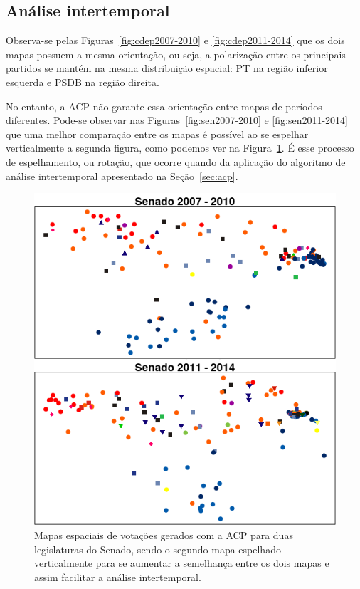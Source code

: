\documentclass[a4paper, 12pt]{article}
\begin{document}
\subsection*{Análise intertemporal}

Observa-se pelas Figuras~\ref{fig:cdep2007-2010} e \ref{fig:cdep2011-2014} que os dois mapas possuem a mesma orientação, ou seja, a polarização entre os principais partidos se mantém na mesma distribuição espacial: PT na região inferior esquerda e PSDB na região direita. 

No entanto, a ACP não garante essa orientação entre mapas de períodos diferentes. Pode-se observar nas Figuras~\ref{fig:sen2007-2010} e \ref{fig:sen2011-2014} que uma melhor comparação entre os mapas é possível ao se espelhar verticalmente a segunda figura, como podemos ver na Figura~\ref{fig:sen-rotacao}. É esse processo de espelhamento, ou rotação, que ocorre quando da aplicação do algoritmo de análise intertemporal apresentado na Seção~\ref{sec:acp}.

\begin{figure}[h!]
  \centering
  \includegraphics[scale=0.7]{figs/sen-rotacao.png}
  \caption{Mapas espaciais de votações gerados com a ACP para duas legislaturas do Senado, sendo o segundo mapa espelhado verticalmente para se aumentar a semelhança entre os dois mapas e assim facilitar a análise intertemporal.}
  \label{fig:sen-rotacao}
\end{figure}
\end{document}
